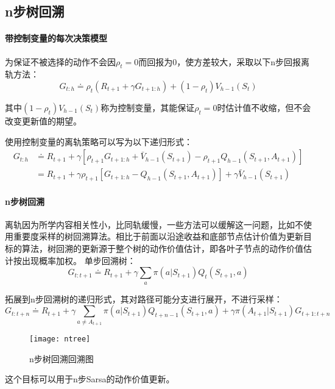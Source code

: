 \documentclass[
12pt, %
a4paper, 
oneside, %
headinclude,footinclude, %
]{scrartcl}
\begin{document}
\subsection{n步树回溯}
\paragraph{带控制变量的每次决策模型}
为保证不被选择的动作不会因$ \rho_t = 0 $而回报为$ 0 $，使方差较大，采取以下n步回报离轨方法：
$$ G_{t:h} \doteq \rho_t (R_{t + 1} + \gamma G_{t + 1:h}) + (1 - \rho_t) V_{h - 1}(S_t) $$

其中$ (1 - \rho_t) V_{h - 1}(S_t) $称为控制变量，其能保证$ \rho_t = 0 $时估计值不收缩，但不会改变更新值的期望。

使用控制变量的离轨策略可以写为以下递归形式：
\begin{align*}
G_{t:h} 
&\doteq R_{t + 1} + \gamma[\rho_{t + 1} G_{t + 1:h} + \bar{V}_{h - 1}(S_{t + 1}) - \rho_{t + 1} Q_{h - 1}(S_{t + 1}, A_{t + 1})] \\
&= R_{t + 1} + \gamma \rho_{t + 1}[G_{t + 1:h} - Q_{h - 1}(S_{t + 1}, A_{t + 1})] + \gamma \bar{V}_{h - 1}(S_{t + 1})
\end{align*}
\paragraph{n步树回溯}
离轨因为所学内容相关性小，比同轨缓慢，一些方法可以缓解这一问题，比如不使用重要度采样的树回溯算法。相比于前面以沿途收益和底部节点估计价值为更新目标的算法，树回溯的更新源于整个树的动作价值估计，即各叶子节点的动作价值估计按出现概率加权。
单步回溯树：
$$ G_{t:t + 1} \doteq R_{t + 1} + \gamma \sum_{a} \pi(a|S_{t + 1}) Q_t(S_{t + 1}, a) $$

拓展到n步回溯树的递归形式，其对路径可能分支进行展开，不进行采样：
$$ G_{t:t + n} \doteq R_{t + 1} + \gamma \sum_{a \neq A_{t + 1}} \pi(a|S_{t + 1}) Q_{t + n - 1}(S_{t + 1}, a) + \gamma \pi(A_{t + 1}|S_{t + 1}) G_{t + 1:t + n} $$

\begin{figure}[H]
\centering
\texttt{[image: ntree]}
\caption[n步树回溯回溯图]{n步树回溯回溯图}
\end{figure}

这个目标可以用于n步Sarsa的动作价值更新。
\end{document}
